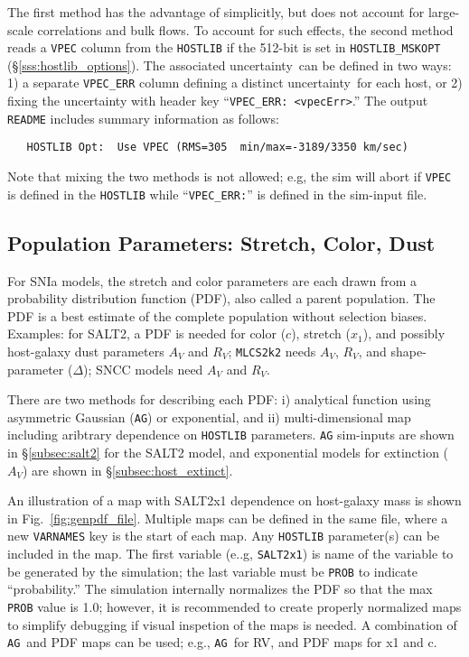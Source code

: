 \documentclass[12pt]{article}
\newcommand{\unc}{uncertainty}
\newcommand{\mlcs}{{\tt MLCS2k2}}
\begin{document}
The first method has the advantage of simplicitly, but does not
account for large-scale correlations and bulk flows.
To account for such effects, the second method reads a {\tt VPEC} 
column from the {\tt HOSTLIB} if the 512-bit is set in 
{\tt HOSTLIB\_MSKOPT} (\S\ref{sss:hostlib_options}). 
The associated \unc\ can be defined in two ways:
1) a separate {\tt VPEC\_ERR} column 
   defining a distinct \unc\ for each host, or 
2) fixing the uncertainty with header key ``{\tt VPEC\_ERR: <vpecErr>}.''
The output {\tt README} includes summary information as follows:
\begin{verbatim}
   HOSTLIB Opt:  Use VPEC (RMS=305  min/max=-3189/3350 km/sec)
\end{verbatim}


Note that mixing the two methods is not allowed;
e.g, the sim will abort if {\tt VPEC} is defined in the {\tt HOSTLIB} 
while ``{\tt VPEC\_ERR:}'' is defined in the sim-input file.


   \clearpage
   \subsection{Population Parameters: Stretch, Color, Dust}
   \label{subsec:genPDF}
\newcommand{\AG}{{\tt AG}}

For SNIa models, the stretch and color parameters are each drawn from a
probability distribution function (PDF), also called a parent population.
The PDF is a best estimate of the complete population without selection
biases. Examples: 
for SALT2, a PDF is needed for color ($c$), stretch ($x_1$),
and possibly host-galaxy dust parameters $A_V$ and $R_V$;
{\mlcs} needs $A_V$, $R_V$, and shape-parameter ($\Delta$);
SNCC models need $A_V$ and $R_V$.

There are two methods for describing each PDF:
i) analytical function using asymmetric Gaussian (\AG) or exponential, and
ii) multi-dimensional map including aribtrary dependence on
{\tt HOSTLIB} parameters.
{\AG} sim-inputs are shown in \S\ref{subsec:salt2} for the SALT2 model,
and exponential models for extinction ($A_V$)
are shown in \S\ref{subsec:host_extinct}.

An illustration of a map with SALT2x1 dependence on host-galaxy mass
is shown in Fig.~\ref{fig:genpdf_file}. Multiple maps can be defined
in the same file, where a new {\tt VARNAMES} key is the start
of each map. Any {\tt HOSTLIB} parameter(s) can be included in the map.
The first variable (e..g, {\tt SALT2x1}) is name of the variable
to be generated by the simulation; the last variable must be {\tt PROB}
to indicate ``probability.'' The simulation internally normalizes the
PDF so that the max {\tt PROB} value is 1.0; however, it is recommended
to create properly normalized maps to simplify debugging if visual
inspetion of the maps is needed.
A combination of \AG\ and PDF maps can be used;
e.g., \AG\ for RV, and PDF maps for x1 and c. 
\end{document}
